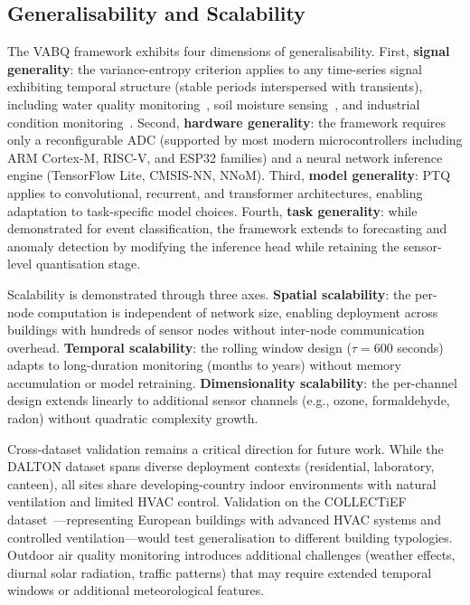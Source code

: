 \subsection{Generalisability and Scalability}
\label{sec:disc_generalisation}

The VABQ framework exhibits four dimensions of generalisability. First, \textbf{signal generality}: the variance-entropy criterion applies to any time-series signal exhibiting temporal structure (stable periods interspersed with transients), including water quality monitoring~\cite{waterquality2024}, soil moisture sensing~\cite{soilmoisture2023}, and industrial condition monitoring~\cite{industrialiot2024}. Second, \textbf{hardware generality}: the framework requires only a reconfigurable ADC (supported by most modern microcontrollers including ARM Cortex-M, RISC-V, and ESP32 families) and a neural network inference engine (TensorFlow Lite, CMSIS-NN, NNoM). Third, \textbf{model generality}: PTQ applies to convolutional, recurrent, and transformer architectures, enabling adaptation to task-specific model choices. Fourth, \textbf{task generality}: while demonstrated for event classification, the framework extends to forecasting and anomaly detection by modifying the inference head while retaining the sensor-level quantisation stage.

Scalability is demonstrated through three axes. \textbf{Spatial scalability}: the per-node computation is independent of network size, enabling deployment across buildings with hundreds of sensor nodes without inter-node communication overhead. \textbf{Temporal scalability}: the rolling window design ($\tau = 600$ seconds) adapts to long-duration monitoring (months to years) without memory accumulation or model retraining. \textbf{Dimensionality scalability}: the per-channel design extends linearly to additional sensor channels (e.g., ozone, formaldehyde, radon) without quadratic complexity growth.

Cross-dataset validation remains a critical direction for future work. While the DALTON dataset spans diverse deployment contexts (residential, laboratory, canteen), all sites share developing-country indoor environments with natural ventilation and limited HVAC control. Validation on the COLLECTiEF dataset~\cite{collectief2026dataset}---representing European buildings with advanced HVAC systems and controlled ventilation---would test generalisation to different building typologies. Outdoor air quality monitoring introduces additional challenges (weather effects, diurnal solar radiation, traffic patterns) that may require extended temporal windows or additional meteorological features.


